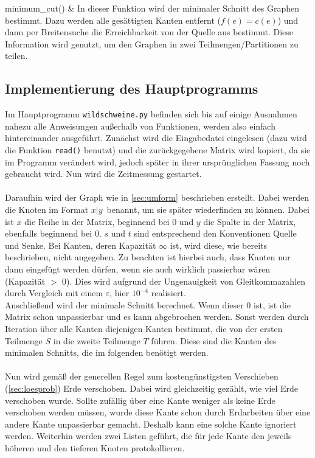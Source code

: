 \documentclass[a4paper, notitlepage, 12pt]{scrartcl}
\begin{document}
\begin{longtabu}
 minimum\_cut() & In dieser Funktion wird der minimaler Schnitt des Graphen bestimmt. Dazu werden alle gesättigten Kanten entfernt ($f(e) = c(e)$) und dann per Breitensuche die Erreichbarkeit von der Quelle aus bestimmt. Diese Information wird genutzt, um den Graphen in zwei Teilmengen/Partitionen zu teilen. \\
 \end{longtabu}
 \subsection{Implementierung des Hauptprogramms}
Im Hauptprogramm \texttt{wildschweine.py} befinden sich bis auf einige Ausnahmen nahezu alle Anweisungen außerhalb von Funktionen, werden also einfach hintereinander ausgeführt. Zunächst wird die Eingabedatei eingelesen (dazu wird die Funktion \texttt{read()} benutzt) und die zurückgegebene Matrix wird kopiert, da sie im Programm verändert wird, jedoch später in ihrer ursprünglichen Fassung noch gebraucht wird. Nun wird die Zeitmessung gestartet. \\ \\
Daraufhin wird der Graph wie in \autoref{sec:umform} beschrieben erstellt. Dabei werden die Knoten im Format \glqq $x|y$\grqq ~benannt, um sie später wiederfinden zu können. Dabei ist $x$ die Reihe in der Matrix, beginnend bei 0 und $y$ die Spalte in der Matrix, ebenfalls beginnend bei 0. $s$ und $t$ sind entsprechend den Konventionen Quelle und Senke. Bei Kanten, deren Kapazität $\infty$ ist, wird diese, wie bereits beschrieben, nicht angegeben. Zu beachten ist hierbei auch, dass Kanten nur dann eingefügt werden dürfen, wenn sie auch wirklich passierbar wären (Kapazität $>$ 0). Dies wird aufgrund der Ungenauigkeit von Gleitkommazahlen durch Vergleich mit einem $\varepsilon$, hier $10^{-4}$ realisiert. \\
Anschließend wird der minimale Schnitt berechnet. Wenn dieser 0 ist, ist die Matrix schon unpassierbar und es kann abgebrochen werden. Sonst werden durch Iteration über alle Kanten diejenigen Kanten bestimmt, die von der ersten Teilmenge $S$ in die zweite Teilmenge $T$ führen. Diese sind die Kanten des minimalen Schnitts, die im folgenden benötigt werden. \\ \\
Nun wird gemäß der generellen Regel zum kostengünstigsten Verschieben (\autoref{sec:loesprob}) Erde verschoben. Dabei wird gleichzeitig gezählt, wie viel Erde verschoben wurde. Sollte zufällig über eine Kante weniger als keine Erde verschoben werden müssen, wurde diese Kante schon durch Erdarbeiten über eine andere Kante unpassierbar gemacht. Deshalb kann eine solche Kante ignoriert werden. Weiterhin werden zwei Listen geführt, die für jede Kante den jeweils höheren und den tieferen Knoten protokollieren. \\ \\
\end{document}
